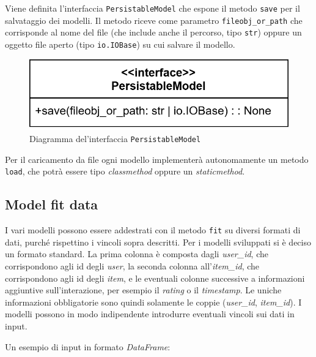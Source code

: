 Viene definita l'interfaccia \texttt{PersistableModel} che espone il metodo \texttt{save} per il salvataggio dei modelli. Il metodo riceve come parametro \texttt{fileobj\_or\_path} che corrisponde al nome del file (che include anche il percorso, tipo \texttt{str}) oppure un oggetto file aperto (tipo \texttt{io.IOBase}) su cui salvare il modello.

\begin{figure}[H]
    \centering
    \includegraphics[scale=0.3]{figures/UML/models/persistable_model.png}
    \caption{Diagramma del'interfaccia \texttt{PersistableModel}}
\end{figure}

Per il caricamento da file ogni modello implementerà autonomamente un metodo \texttt{load}, che potrà essere tipo \textit{classmethod} oppure un \textit{staticmethod}.

\subsection{Model fit data}\label{model_fit_data}

I vari modelli possono essere addestrati con il metodo \texttt{fit} su diversi formati di dati, purché rispettino i vincoli sopra descritti. Per i modelli sviluppati si è deciso un formato standard. La prima colonna è composta dagli \textit{user\_id}, che corrispondono agli id degli \textit{user}, la seconda colonna all'\textit{item\_id}, che corrispondono agli id degli \textit{item}, e le eventuali colonne successive a informazioni aggiuntive sull'interazione, per esempio il \textit{rating} o il \textit{timestamp}. Le uniche informazioni obbligatorie sono quindi solamente le coppie (\textit{user\_id}, \textit{item\_id}). I modelli possono in modo indipendente introdurre eventuali vincoli sui dati in input.

Un esempio di input in formato \textit{DataFrame}:


